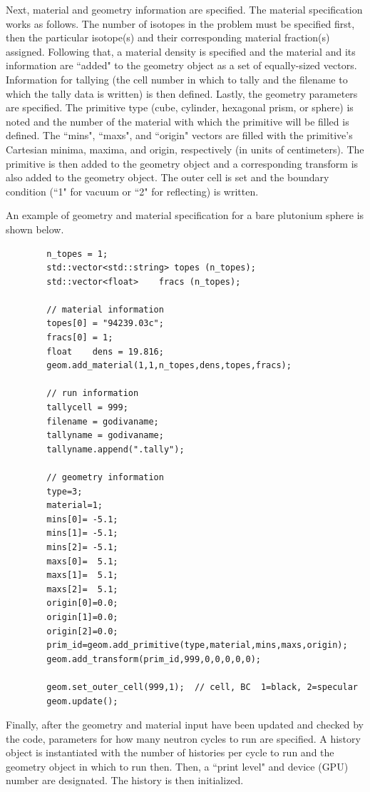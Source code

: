 \documentclass[twoside,a4paper]{refart}
\begin{document}
Next, material and geometry information are specified. The material specification works as follows. The 
number of isotopes in the problem must be specified first, then the particular isotope(s) and their 
corresponding material fraction(s) assigned. Following that, a material density is specified and the 
material and its information are ``added" to the geometry object as a set of equally-sized vectors. Information for tallying (the cell number in which to tally and the filename to which the tally data is written) is then defined.  Lastly, the geometry parameters are specified. The primitive type (cube, cylinder, hexagonal prism, or sphere) is noted and the number of the material with which the primitive will be filled is defined. The ``mins", ``maxs", and ``origin" vectors are filled with the primitive's Cartesian minima, maxima, and origin, respectively (in units of centimeters). The primitive is then added to the geometry object and a corresponding transform is also added to the geometry object. The outer cell is set and the boundary condition (``1" for vacuum or ``2" for reflecting) is written.

An example of geometry and material specification for a bare plutonium sphere is shown below.

\begin{verbatim}
		n_topes = 1;
		std::vector<std::string> topes (n_topes);
		std::vector<float>    fracs (n_topes);

		// material information
		topes[0] = "94239.03c";
		fracs[0] = 1;      
		float    dens = 19.816;
		geom.add_material(1,1,n_topes,dens,topes,fracs);
		
		// run information
		tallycell = 999;
		filename = godivaname;
		tallyname = godivaname;
		tallyname.append(".tally");
	
		// geometry information
		type=3;
		material=1;
		mins[0]= -5.1;
		mins[1]= -5.1;
		mins[2]= -5.1;
		maxs[0]=  5.1;
		maxs[1]=  5.1;
		maxs[2]=  5.1;
		origin[0]=0.0;
		origin[1]=0.0;
		origin[2]=0.0;
		prim_id=geom.add_primitive(type,material,mins,maxs,origin);
		geom.add_transform(prim_id,999,0,0,0,0,0);

		geom.set_outer_cell(999,1);  // cell, BC  1=black, 2=specular
		geom.update();
\end{verbatim}

Finally, after the geometry and material input have been updated and checked by the code, parameters for 
how many neutron cycles to run are specified. A history object is instantiated with the number of
histories per cycle to run and the geometry object in which to run then. Then, a ``print level" and 
device (GPU) number are designated. The history is then initialized.
\end{document}
